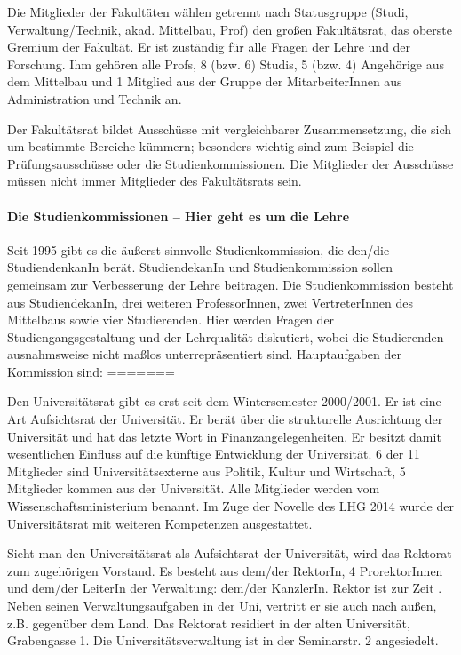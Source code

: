 Die Mitglieder der Fakultäten wählen getrennt nach Statusgruppe (Studi,
Verwaltung/Technik, akad. Mittelbau, Prof) den großen Fakultätsrat, das oberste
Gremium der Fakultät. Er ist zuständig für alle Fragen der Lehre und der
Forschung. Ihm gehören alle Profs, 8 (bzw. 6) Studis, 5 (bzw. 4) Angehörige aus
dem Mittelbau und 1 Mitglied aus der Gruppe der MitarbeiterInnen aus
Administration und Technik an.

Der Fakultätsrat bildet Ausschüsse mit vergleichbarer Zusammensetzung, die sich
um bestimmte Bereiche kümmern; besonders wichtig sind zum Beispiel die
Prüfungsausschüsse oder die Studienkommissionen. Die Mitglieder der Ausschüsse
müssen nicht immer Mitglieder des Fakultätsrats sein.


\paragraph{Die Studienkommissionen -- Hier geht es um die Lehre}

Seit 1995 gibt es die äußerst sinnvolle Studienkommission, die den/die
StudiendenkanIn berät. StudiendekanIn und Studienkommission sollen gemeinsam
zur Verbesserung der Lehre beitragen. Die Studienkommission besteht aus
StudiendekanIn, drei weiteren ProfessorInnen, zwei VertreterInnen des
Mittelbaus sowie vier Studierenden. Hier werden Fragen der
Studiengangsgestaltung und der Lehrqualität diskutiert, wobei die Studierenden
ausnahmsweise nicht maßlos unterrepräsentiert sind. Hauptaufgaben der
Kommission sind:
=======


Den Universitätsrat gibt es erst seit dem Wintersemester 2000/2001. Er ist
eine Art Aufsichtsrat der Universität. Er berät über die strukturelle
Ausrichtung der Universität und hat das letzte Wort in
Finanzangelegenheiten. Er besitzt damit wesentlichen Einfluss auf die
künftige Entwicklung der Universität. 6 der 11 Mitglieder sind
Universitätsexterne aus Politik, Kultur und Wirtschaft, 5 Mitglieder
kommen aus der Universität. Alle Mitglieder werden vom
Wissenschaftsministerium benannt. Im Zuge der Novelle des LHG 2014 wurde
der Universitätsrat mit weiteren Kompetenzen ausgestattet.

Sieht man den Universitätsrat als Aufsichtsrat der Universität, wird das
Rektorat zum zugehörigen Vorstand. Es besteht aus dem/der RektorIn, 4
ProrektorInnen und dem/der LeiterIn der Verwaltung: dem/der KanzlerIn.
Rektor ist zur Zeit \rektor . Neben seinen Verwaltungsaufgaben in
der Uni, vertritt er sie auch nach außen, z.B. gegenüber dem Land. Das
Rektorat residiert in der alten Universität, Grabengasse 1. Die
Universitätsverwaltung ist in der Seminarstr. 2 angesiedelt.

